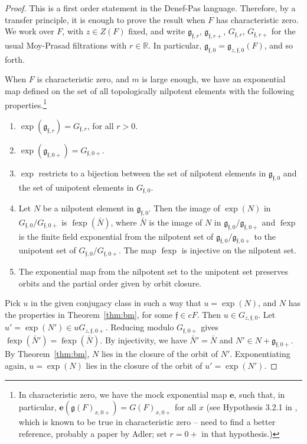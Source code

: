 \documentclass[12pt]{amsart}
\newcommand{\op}[1]{\operatorname{#1}}
\newcommand{\ring}[1]{{\mathbb #1}}
\def\s{{\mathfrak{f}}}
\newcommand{\fg}{\mathfrak{g}}
\theoremstyle{plain}
\theoremstyle{definition}
\begin{document}
\begin{proof} This is a first order statement in the Denef-Pas
  language.  Therefore, by a transfer principle, it is enough to prove
  the result when $F$ has characteristic zero.  We work over $F$, with
  $z\in Z(F)$ fixed, and write $\fg_{\s,r}$, $\fg_{\s,r+}$, $G_{\s,r}$,
  $G_{\s,r+}$ for the usual Moy-Prasad filtrations with
  $r\in\ring{R}$.  In particular, $\fg_{\s,0}=\fg_{z,\s,0}(F)$, and so
  forth.

  When $F$ is characteristic zero, and $m$ is large enough, we have an
  exponential map defined on the set of all topologically nilpotent
  elements with the following properties.\footnote{In characteristic
    zero, we have the mock exponential map ${\mathbf e}$, such that,
    in particular, ${\mathbf e}(\fg(F)_{x,0+})=G(F)_{x, 0+}$ for all
    $x$ (see Hypothesis 3.2.1 in \cite{debacker:homogeneity}, which is
    known to be true in characteristic zero -- need to find a better
    reference, probably a paper by Adler; set $r=0+$ in that
    hypothesis.) }
  \begin{enumerate}
    \item $\exp(\fg_{\s,r}) = G_{\s,r}$, for all $r>0$.
    \item $\exp(\fg_{\s,0+}) = G_{\s,0+}$.
    \item $\exp$ restricts to a bijection between the set of
      nilpotent elements in $\fg_{\s,0}$ and the set of unipotent
      elements in $G_{\s,0}$.
   \item Let $N$ be a nilpotent element in $\fg_{\s,0}$.  Then the
     image of $\exp(N)$ in $G_{\s,0}/G_{\s,0+}$ is $\op{fexp}(\bar N)$,
     where $\bar N$ is the image of $N$ in $\fg_{\s,0}/\fg_{\s,0+}$ and
     $\op{fexp}$ is the finite field exponential from the nilpotent
     set of $\fg_{\s,0}/\fg_{\s,0+}$ to the unipotent set of
     $G_{\s,0}/G_{\s,0+}$. The map $\op{fexp}$ is injective on the
     nilpotent set.
   \item The exponential map from the nilpotent set to the unipotent
     set preserves orbits and the partial order given by orbit closure.
 \end{enumerate}

  Pick $u$ in the given conjugacy class in such a way that $u =
  \exp(N)$, and $N$ has the properties in Theorem~\ref{thm:bm}, for
  some $\s\in cF$.
  Then $u\in G_{z,\s,0}$.  Let $u' = \exp(N') \in u G_{z,\s,0+}$.
  Reducing modulo
  $G_{\s,0+}$ gives $\op{fexp}(\bar N') = \op{fexp}(\bar N)$. By
  injectivity, we have $\bar N' = \bar N$ and $N' \in N +
  \fg_{\s,0+}$.  By Theorem~\ref{thm:bm}, $N$ lies in the closure of the
  orbit of $N'$.  Exponentiating again, $u = \exp(N)$ lies in the
  closure of the orbit of $u' = \exp(N')$.
\end{proof}
\end{document}
